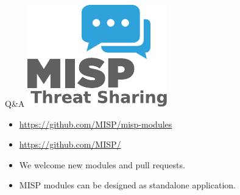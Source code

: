 \begin{frame}[t,fragile] {Q\&A}
\includegraphics[scale=0.5]{misplogo.pdf}
\begin{itemize}
        \item \url{https://github.com/MISP/misp-modules}
        \item \url{https://github.com/MISP/}
        \item We welcome new modules and pull requests.
        \item MISP modules can be designed as standalone application.
\end{itemize}

\end{frame}

